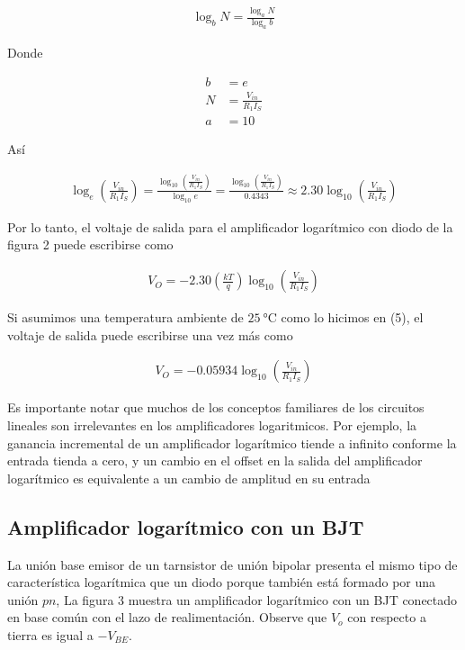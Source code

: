 \documentclass{article}
\begin{document}
\begin{align}
	\log_b N = \frac{\log_a N}{\log_a b}
\end{align}

\noindent Donde

\begin{align}
	b &= e \nonumber \\
	N &= \frac{V_{in}}{R_1I_S} \nonumber \\
	a &= 10 \nonumber
\end{align}

\noindent Así

\begin{align}
	\log_e \left( \frac{V_{in}}{R_1I_S} \right) = \frac{ \log_{10} \left( \frac{V_{in}}{R_1I_S} \right) }{\log_{10} e} = \frac{ \log_{10} \left( \frac{V_{in}}{R_1I_S} \right) }{0.4343} \approx 2.30 \log_{10} \left( \frac{V_{in}}{R_1I_S} \right)
\end{align}

\noindent Por lo tanto, el voltaje de salida para el amplificador logarítmico con diodo de la figura 2 puede escribirse como

\begin{align}
	V_O = -2.30\left( \frac{kT}{q} \right) \log_{10} \left( \frac{V_{in}}{R_1I_S} \right)
\end{align}

\noindent Si asumimos una temperatura ambiente de $\qty{25}{\degreeCelsius}$ como lo hicimos en (5), el voltaje de salida puede escribirse una vez más como

\begin{align}
	V_O = -0.05934 \log_{10} \left( \frac{V_{in}}{R_1I_S} \right)
\end{align}

Es importante notar que muchos de los conceptos familiares de los circuitos lineales son irrelevantes en los amplificadores logaritmicos. Por ejemplo, la ganancia incremental de un amplificador logarítmico tiende a infinito conforme  la entrada tienda a cero, y un cambio en el offset en la salida del amplificador logarítmico es equivalente a un cambio de amplitud en su entrada 

\subsection*{Amplificador logarítmico con un BJT}
La unión base emisor de un tarnsistor de unión bipolar presenta el mismo tipo de característica logarítmica que un diodo porque también está formado por una unión $pn$, La figura 3 muestra un amplificador logarítmico con un BJT conectado en base común con el lazo de realimentación. Observe que $V_o$ con respecto a tierra es igual a $-V_{BE}$.
\end{document}
